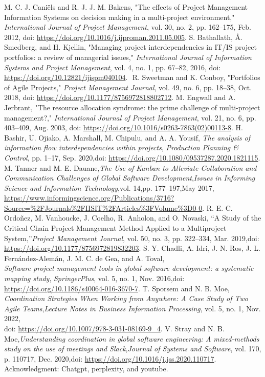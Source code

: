 \documentclass{llncs}
\begin{document}
\begin{thebibliography}{11}
  M. C. J. Caniëls and R. J. J. M. Bakens, "The effects of Project Management Information Systems on decision making in a multi-project environment," \textit{International Journal of Project Management}, vol. 30, no. 2, pp. 162–175, Feb. 2012, doi: \url{https://doi.org/10.1016/j.ijproman.2011.05.005}.
  S. Bathallath, Å. Smedberg, and H. Kjellin, "Managing project interdependencies in IT/IS project portfolios: a review of managerial issues," \textit{International Journal of Information Systems and Project Management}, vol. 4, no. 1, pp. 67–82, 2016, doi: \url{https://doi.org/10.12821/ijispm040104}.
‌
  R. Sweetman and K. Conboy, "Portfolios of Agile Projects," \textit{Project Management Journal}, vol. 49, no. 6, pp. 18–38, Oct. 2018, doi: \url{https://doi.org/10.1177/8756972818802712}.
 M. Engwall and A. Jerbrant, "The resource allocation syndrome: the prime challenge of multi-project management?," \textit{International Journal of Project Management}, vol. 21, no. 6, pp. 403–409, Aug. 2003, doi: \url{https://doi.org/10.1016/s0263-7863(02)00113-8}.
H. Bashir, U. Ojiako, A. Marshall, M. Chipulu, and A. A. Yousif,
\textit{The analysis of information flow interdependencies within projects},
\textit{Production Planning \& Control}, pp. 1–17, Sep. 2020,doi: \url{https://doi.org/10.1080/09537287.2020.1821115}.
 M. Tanner and M. E. Dauane,\textit{The Use of Kanban to Alleviate Collaboration and Communication Challenges of Global Software Development},\textit{Issues in Informing Science and Information Technology},vol. 14,pp. 177–197,May 2017,
\url{https://www.informingscience.org/Publications/3716?Source=%2FJournals%2FIISIT%2FArticles%3FVolume%3D0-0}.
R. E. C. Ordoñez, M. Vanhoucke, J. Coelho, R. Anholon, and O. Novaski,
``A Study of the Critical Chain Project Management Method Applied to a Multiproject System,''\emph{Project Management Journal}, vol. 50, no. 3, pp. 322–334, Mar. 2019,doi: \url{https://doi.org/10.1177/8756972819832203}.
S. Y. Chadli, A. Idri, J. N. Ros, J. L. Fernández-Alemán, J. M. C. de Gea, and A. Toval, \\ \emph{Software project management tools in global software development: a systematic mapping study}, \emph{SpringerPlus}, vol. 5, no. 1, Nov. 2016,doi: \url{https://doi.org/10.1186/s40064-016-3670-7}.
T. Sporsem and N. B. Moe, \emph{Coordination Strategies When Working from Anywhere: A Case Study of Two Agile Teams},\emph{Lecture Notes in Business Information Processing}, vol. 5, no. 1, Nov. 2022, \\
doi: \url{https://doi.org/10.1007/978-3-031-08169-9_4}.
V. Stray and N. B. Moe,\emph{Understanding coordination in global software engineering: A mixed-methods study on the use of meetings and Slack},\emph{Journal of Systems and Software}, vol. 170, p. 110717, Dec. 2020,doi: \url{https://doi.org/10.1016/j.jss.2020.110717}.‌
‌
Acknowledgment: Chatgpt, perplexity, and youtube.

\end{thebibliography}
\end{document}
